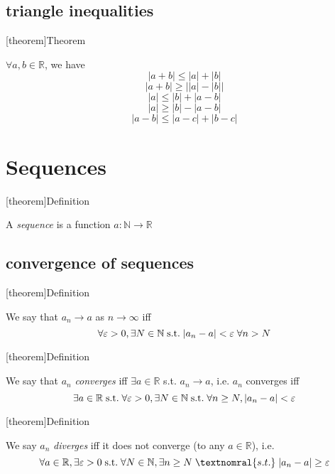 \documentclass[12pt]{report}
\theoremstyle{definition}
\begin{document}
\section{triangle inequalities}
[theorem]{Theorem}
\begin{basic triangle ineq}
    $\forall a, b \in \mathbb{R}$, we have\[
        |a + b| \le |a| + |b|
    \]\[
        |a + b| \ge \Big||a| - |b|\Big|
    \]\[
        |a| \le |b| + |a - b|
    \]\[
        |a| \ge |b| - |a - b|
    \]\[
        |a - b| \le |a - c| + |b - c|
    \]
\end{basic triangle ineq}

\chapter{Sequences}
[theorem]{Definition}
\begin{sequence}
    A \emph{sequence} is a function $a : \mathbb{N} \rightarrow \mathbb{R}$
\end{sequence}

\section{convergence of sequences}
[theorem]{Definition}
\begin{convergence}
    We say that $a_n \rightarrow a$ as $n \rightarrow \infty$ iff \[
        \forall \varepsilon > 0, \exists N \in \mathbb{N} \;\textnormal{s.t.} \; |a_n - a| < \varepsilon \;\forall n > N
    \]
\end{convergence}

[theorem]{Definition}
\begin{convergent sequence}
    We say that $a_n$ \emph{converges} iff $\exists a \in \mathbb{R}$ s.t. $a_n \rightarrow a$, i.e. $a_n$ converges iff\[
        \exists a \in \mathbb{R} \;\textnormal{s.t.}\; \forall \varepsilon > 0, \exists N \in \mathbb{N} 
        \;\textnormal{s.t.}\; \forall n \ge N, |a_n - a| < \varepsilon
    \]
\end{convergent sequence}

[theorem]{Definition}
\begin{divergent sequence}
    We say $a_n$ \emph{diverges} iff it does not converge (to any $a \in \mathbb{R}$), i.e. \[
        \forall a \in \mathbb{R}, \exists \varepsilon > 0 \;\textnormal{s.t.}\; \forall N \in \mathbb{N},
        \exists n \ge N \;\textnomral{s.t.}\; |a_n - a| \ge \varepsilon
    \]
\end{divergent sequence}
\end{document}
